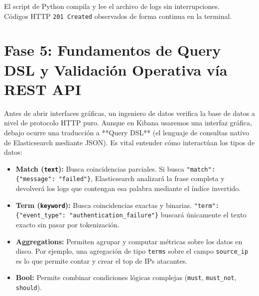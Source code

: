 \documentclass[
  coursetitle={Cómputo Nube y Tecnologías Emergentes},
  coursehours={96},
  coursedate={Verano 2026},
  doctype={Práctica},
  otherlangs={english,french},
  authorname={Lázaro},
  authorsurname={Bustio-Martínez},
  authortitle={PhD},
  role={Profesor Investigador},
  email={lbustio@inaoe.mx},
  phone={5559504000},
  ext={7459},
  institution={Instituto Nacional de Astrofísica, Óptica y Electrónica (INAOE)},
  department={Maestría en Ciencias en Tecnologías de Seguridad},
  address={Luis Enrique Erro 1, Sta. Ma. Tonantzintla, San Andrés Cholula, CP 72840, Puebla, México},
  margin={0.5in}
]{../../lbustio_lecture_notes}
\begin{document}
\begin{tcolorbox}[colback=green!5!white,colframe=green!60!black,title=\textbf{Checkpoint de Validación 3}]
\checkmark El script de Python compila y lee el archivo de logs sin interrupciones.\\
\checkmark Códigos HTTP \texttt{201 Created} observados de forma continua en la terminal.
\end{tcolorbox}

\section{Fase 5: Fundamentos de Query DSL y Validación Operativa vía REST API}
Antes de abrir interfaces gráficas, un ingeniero de datos verifica la base de datos a nivel de protocolo HTTP puro. Aunque en Kibana usaremos una interfaz gráfica, debajo ocurre una traducción a **Query DSL** (el lenguaje de consultas nativo de Elasticsearch mediante JSON). Es vital entender cómo interactúan los tipos de datos:

\begin{itemize}
    \item \textbf{Match (\texttt{text}):} Busca coincidencias parciales. Si busca \texttt{"match": \{"message": "failed"\}}, Elasticsearch analizará la frase completa y devolverá los logs que contengan esa palabra mediante el índice invertido.
    \item \textbf{Term (\texttt{keyword}):} Busca coincidencias exactas y binarias. \texttt{"term": \{"event\_type": "authentication\_failure"\}} buscará únicamente el texto exacto sin pasar por tokenización.
    \item \textbf{Aggregations:} Permiten agrupar y computar métricas sobre los datos en disco. Por ejemplo, una agregación de tipo \texttt{terms} sobre el campo \texttt{source\_ip} es lo que permite contar y crear el top de IPs atacantes.
    \item \textbf{Bool:} Permite combinar condiciones lógicas complejas (\texttt{must}, \texttt{must\_not}, \texttt{should}).
\end{itemize}
\end{document}
